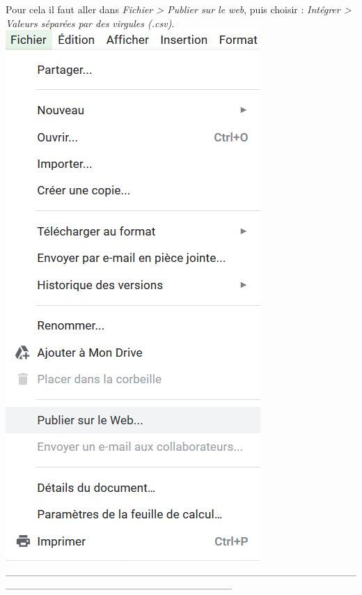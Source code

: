 \documentclass[]{book}
\begin{document}
Pour cela il faut aller dans \emph{Fichier \textgreater{} Publier sur le
web}, puis choisir : \emph{Intégrer \textgreater{} Valeurs séparées par
des virgules (.csv)}. \includegraphics{image/notebook-googlesheets1.png}
\_\_\_\_\_\_\_\_\_\_\_\_\_\_\_\_\_\_\_\_\_\_\_\_\_\_\_\_\_\_\_\_\_\_\_\_\_\_\_\_\_\_\_\_\_\_\_\_\_\_\_\_\_\_\_\_\_\_\_\_\_\_\_\_\_\_\_\_\_\_\_\_\_\_\_\_\_\_\_
\end{document}
